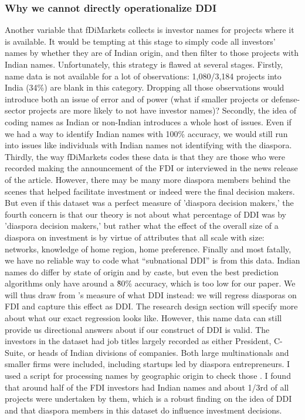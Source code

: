 \documentclass[12pt]{article}
\begin{document}
    \subsubsection{Why we cannot directly operationalize DDI} \label{subsection:no operationalizing DDI}
    Another variable that fDiMarkets collects is investor names for projects where it is available. It would be tempting at this stage to simply code all investors' names by whether they are of Indian origin, and then filter to those projects with Indian names. Unfortunately, this strategy is flawed at several stages.
    Firstly, name data is not available for a lot of observations: 1,080/3,184 projects into India (34\%) are blank in this category. Dropping all those observations would introduce both an issue of error and of power (what if smaller projects or defense-sector projects are more likely to not have investor names)? Secondly, the idea of coding names as Indian or non-Indian introduces a whole host of issues. Even if we had a way to identify Indian names with 100\% accuracy, we would still run into issues like individuals with Indian names not identifying with the diaspora.
    Thirdly, the way fDiMarkets codes these data is that they are those who were recorded making the announcement of the FDI or interviewed in the news release of the article. However, there may be many more diaspora members behind the scenes that helped facilitate investment or indeed were the final decision makers. But even if this dataset was a perfect measure of 'diaspora decision makers,' the fourth concern is that our theory is not about what percentage of DDI was by 'diaspora decision makers,' but rather what the effect of the overall size of a diaspora on investment is by virtue of attributes that all scale with size: networks, knowledge of home region, home preference. Finally and most fatally, we have no reliable way to code what ``subnational DDI'' is from this data. Indian names do differ by state of origin and by caste, but even the best prediction algorithms only have around a \~80\% accuracy, which is too low for our paper. \citep{dhingra_instate_2023}
    We will thus draw from \citet{leblang_familiarity_2010}'s measure of what DDI instead: we will regress diasporas on FDI and capture this effect as DDI. The research design section will specify more about what our exact regression looks like.
   However, this name data can still provide us directional answers about if our construct of DDI is valid. The investors in the dataset had job titles largely recorded as either President, C-Suite, or heads of Indian divisions of companies. Both large multinationals and smaller firms were included, including startups led by diaspora entrepreneurs. I used a script for processing names by geographic origin to check those  \citep{dhingra_instate_2023}. I found that around half of the FDI investors had Indian names and about 1/3rd of all projects were undertaken by them, which is a robust finding on the idea of DDI and that diaspora members in this dataset do influence investment decisions.
\end{document}
